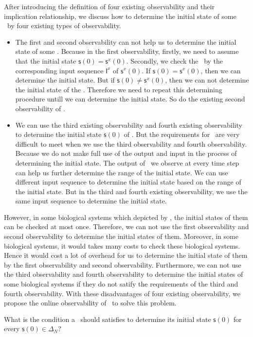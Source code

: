 After introducing the definition of four existing observability and their implication relationship, we discuss how to determine the initial state of some \BCNs\ by four existing types of observability. 
\begin{itemize}
\item The first and second observability can not help us to determine the initial state of some \BCNs. Because in the first observability, firstly, we need to assume that the initial state $\mathsf{s}(0)=\mathsf{s}^{x}(0)$. Secondly, we check the \BCN\ by the corresponding input sequence $\mathsf{I}^x$ of $\mathsf{s}^{x}(0)$. If $\mathsf{s}(0)=\mathsf{s}^{x}(0)$, then we can determine the initial state. But if $\mathsf{s}(0)\ne \mathsf{s}^{x}(0)$, then we can not determine the initial state of the \BCN. Therefore we need to repeat this determining procedure untill we can determine the initial state.
So do the existing second observability of \BCNs.
\item We can use the third existing observability and fourth existing observability to determine the initial state $\mathsf{s}(0)$ of \BCNs. But the requirements for \BCNs\ are very difficult to meet when we use the third observability and fourth observability. Because we do not make full use of the output and input in the process of determining the initial state. The output of \BCNs\ we observe at every time step can help us further determine the range of the initial state. We can use different input sequence to determine the initial state based on the range of the initial state. But in the third and fourth existing observability, we use the same input sequence to determine the initial state.
\end{itemize} 
 
However, in some biological systems which depicted by \BCNs, the initial states of them can be checked at most once. Therefore, we can not use the first observability and second observability to determine the initial states of them. Moreover, in some biological systems, it would takes many costs to check these biological systems. Hence it would cost a lot of overhead for us to determine the initial state of them by the first observability and second observability. Furthermore, we can not use the third observability and fourth observability to determine the initial states of some biological systems if they do not satify the requirements of the third and fourth observability. With these disadvantages of four existing observability, we propose the online observability of \BCNs\ to solve this problem.

 \begin{problem}
\label{pro:2}
What is the condition a \BCN\ should satisfies to determine its initial state $\mathsf{s}(0)$ for every $\mathsf{s}(0)\in\Delta_N$?
\end{problem}